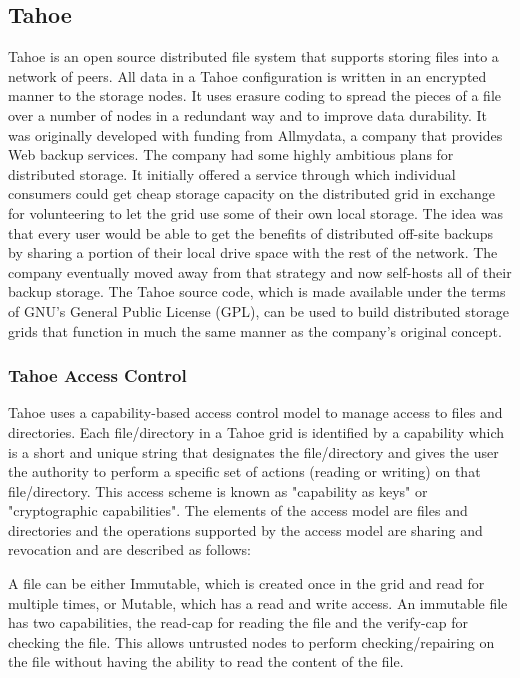\documentclass[11pt]{article}
\begin{document}
\subsection{Tahoe}
Tahoe is an open source distributed file system that supports storing 
files into a network of peers. All data in a Tahoe configuration is 
written in an encrypted manner to the storage nodes. It uses erasure 
coding to spread the pieces of a file over a number of nodes in a 
redundant way and to improve data durability. It was originally 
developed with funding from Allmydata, a company that provides Web 
backup services. The company had some highly ambitious plans for 
distributed storage. It initially offered a service through which 
individual consumers could get cheap storage capacity on the 
distributed grid in exchange for volunteering to let the grid use 
some of their own local storage. The idea was that every user would 
be able to get the benefits of distributed off-site backups by sharing 
a portion of their local drive space with the rest of the network. The 
company eventually moved away from that strategy and now self-hosts all 
of their backup storage. The Tahoe source code, which is made available 
under the terms of GNU's General Public License (GPL), can be used to 
build distributed storage grids that function in much the same manner 
as the company’s original concept.

\subsubsection{Tahoe Access Control}
Tahoe uses a capability-based access control model to manage access to 
files and directories. Each file/directory in a Tahoe grid is identified 
by a capability which is a short and unique string that designates the 
file/directory and gives the user the authority to perform a specific 
set of actions (reading or writing) on that file/directory. This access 
scheme is known as "capability as keys" or "cryptographic capabilities". 
The elements of the access model are files and directories and the 
operations supported by the access model are sharing and revocation and 
are described as follows: 

A file can be either Immutable, which is created once in the grid and read 
for multiple times, or Mutable, which has a read and write access. An 
immutable file has two capabilities, the read-cap for reading the file and 
the verify-cap for checking the file. This allows untrusted nodes to perform 
checking/repairing on the file without having the ability to read the 
content of the file. 
\end{document}
